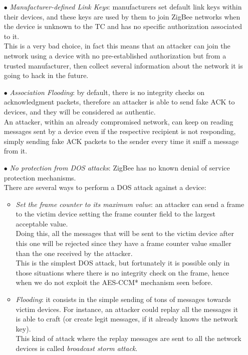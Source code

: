 \documentclass[12pt]{report}
\begin{document}
\begin{itemize}
\item[$\bullet$] \emph{Manufacturer-defined Link Keys}: manufacturers set default link keys within their devices, and these keys are used by them to join ZigBee networks when the device is unknown to the TC and has no specific authorization associated to it.\\
This is a very bad choice, in fact this means that an attacker can join the network using a device with no pre-established authorization but from a trusted manufacturer, then collect several information about the network it is going to hack in the future.

\item[$\bullet$] \emph{Association Flooding}: by default, there is no integrity checks on acknowledgment packets, therefore an attacker is able to send fake ACK to devices, and they will be considered as authentic.\\
An attacker, within an already compromised network, can keep on reading messages sent by a device even if the respective recipient is not responding, simply sending fake ACK packets to the sender every time it sniff a message from it. 

\item[$\bullet$] \emph{No protection from DOS attacks}: ZigBee has no known denial of service protection mechanisms.\\
There are several ways to perform a DOS attack against a device:


\begin{itemize}
\setlength{\itemindent}{+4mm}
\item \emph{Set the frame counter to its maximum value}: an attacker can send a frame to the victim device setting the frame counter field to the largest acceptable value.\\
Doing this, all the messages that will be sent to the victim device after this one will be rejected since they have a frame counter value smaller than the one received by the attacker.\\
This is the simplest DOS attack, but fortunately it is possible only in those situations where there is no integrity check on the frame, hence when we do not exploit the AES-CCM* mechanism seen before.\\

\item \emph{Flooding}: it consists in the simple sending of tons of messages towards victim devices. For instance, an attacker could replay all the messages it is able to craft (or create legit messages, if it already knows the network key).\\
This kind of attack where the replay messages are sent to all the network devices is called \emph{broadcast storm attack}.\\


\end{itemize}
\end{itemize}
\end{document}
